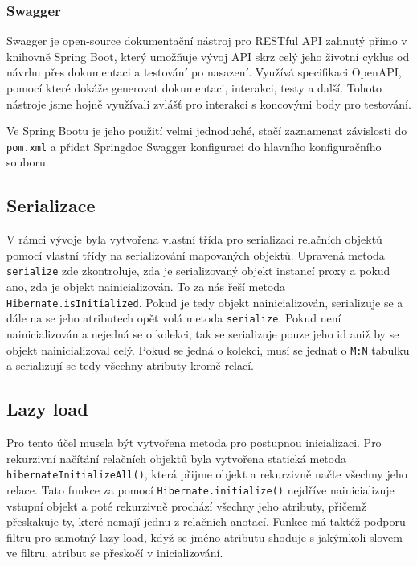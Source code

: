 \subsubsection*{Swagger}\label{sec:impl:swagger}
Swagger je open-source dokumentační nástroj pro RESTful API zahnutý přímo v knihovně Spring Boot, který umožňuje vývoj API skrz celý jeho životní cyklus od návrhu přes dokumentaci a testování po nasazení. Využívá specifikaci OpenAPI, pomocí které dokáže generovat dokumentaci, interakci, testy a další.\cite{swagger:about} Tohoto nástroje jsme hojně využívali zvlášť pro interakci s koncovými body pro testování.

Ve Spring Bootu je jeho použití velmi jednoduché, stačí zaznamenat závislosti do \texttt{pom.xml} a přidat Springdoc Swagger konfiguraci do hlavního konfiguračního souboru.

\subsection{Serializace}\label{sec:impl:serialization}
V rámci vývoje byla vytvořena vlastní třída pro serializaci relačních objektů pomocí vlastní třídy 
na serializování mapovaných objektů. Upravená metoda \texttt{serialize} zde zkontroluje, zda je serializovaný objekt instancí proxy a pokud ano, zda je objekt nainicializován. To za nás řeší metoda \texttt{Hibernate.isInitialized}. 
Pokud je tedy objekt nainicializován, serializuje se a dále na se jeho atributech opět volá metoda \texttt{serialize}. Pokud není nainicializován a nejedná se o kolekci, tak se serializuje pouze jeho id aniž by se objekt nainicializoval celý.
Pokud se jedná o kolekci, musí se jednat o \texttt{M:N} tabulku a serializují se tedy všechny atributy kromě relací. 


\subsection{Lazy load}\label{sec:impl:lazyload}
Pro tento účel musela být vytvořena metoda pro postupnou inicializaci. Pro rekurzivní načítání relačních objektů byla vytvořena statická metoda \texttt{hibernateInitializeAll()}, která přijme objekt a rekurzivně načte všechny jeho relace.
Tato funkce za pomocí \texttt{Hibernate.initialize()} nejdříve nainicializuje vstupní objekt a poté rekurzivně prochází všechny jeho atributy, přičemž přeskakuje ty, které nemají jednu z relačních anotací. Funkce má taktéž podporu filtru pro samotný lazy load, když se jméno atributu shoduje s jakýmkoli slovem ve filtru, atribut se přeskočí v inicializování.


